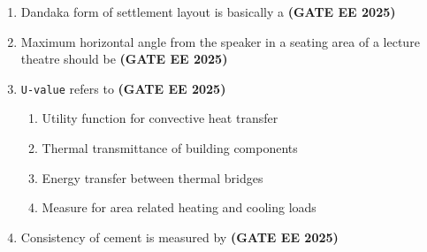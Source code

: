 \documentclass[journal,12pt,onecolumn]{IEEEtran}
\theoremstyle{remark}
\begin{document}
{\begin{enumerate}
\begin{enumerate}
\end{enumerate}
\item Dandaka form of settlement layout is basically a \hfill \textbf{(GATE EE 2025)}
\begin{enumerate}
\end{enumerate}
\item Maximum horizontal angle from the speaker in a seating area of a lecture theatre should be \hfill \textbf{(GATE EE 2025)}
\begin{enumerate}
\end{enumerate}
\item \texttt{U-value} refers to \hfill \textbf{(GATE EE 2025)}
\begin{enumerate}
    \item Utility function for convective heat transfer
    \item Thermal transmittance of building components
    \item Energy transfer between thermal bridges
    \item Measure for area related heating and cooling loads
\end{enumerate}
\item Consistency of cement is measured by \hfill \textbf{(GATE EE 2025)}
\begin{enumerate}

\end{enumerate}
\end{enumerate}}
\end{document}
